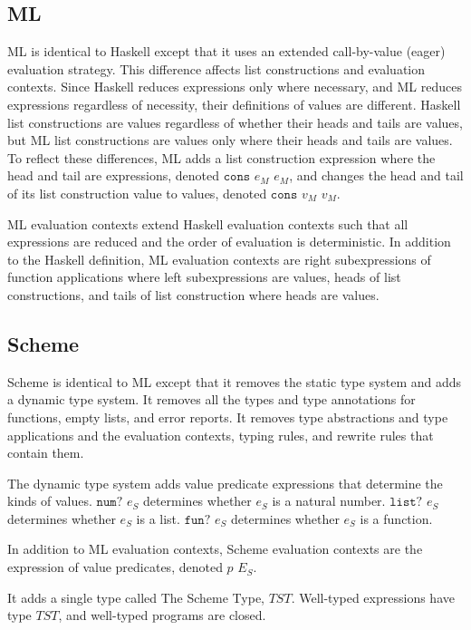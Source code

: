 \subsection{ML}

ML is identical to Haskell except that it uses an extended call-by-value (eager) evaluation strategy.  This difference affects list constructions and evaluation contexts.  Since Haskell reduces expressions only where necessary, and ML reduces expressions regardless of necessity, their definitions of values are different.  Haskell list constructions are values regardless of whether their heads and tails are values, but ML list constructions are values only where their heads and tails are values.  To reflect these differences, ML adds a list construction expression where the head and tail are expressions, denoted $\mathtt{cons}$ $e_{M}$ $e_{M}$, and changes the head and tail of its list construction value to values, denoted $\mathtt{cons}$ $v_{M}$ $v_{M}$.

ML evaluation contexts extend Haskell evaluation contexts such that all expressions are reduced and the order of evaluation is deterministic.  In addition to the Haskell definition, ML evaluation contexts are right subexpressions of function applications where left subexpressions are values, heads of list constructions, and tails of list construction where heads are values.

\subsection{Scheme}

Scheme is identical to ML except that it removes the static type system and adds a dynamic type system.  It removes all the types and type annotations for functions, empty lists, and error reports.  It removes type abstractions and type applications and the evaluation contexts, typing rules, and rewrite rules that contain them.

The dynamic type system adds value predicate expressions that determine the kinds of values.  $\mathtt{num?}$ $e_{S}$ determines whether $e_{S}$ is a natural number.  $\mathtt{list?}$ $e_{S}$ determines whether $e_{S}$ is a list.  $\mathtt{fun?}$ $e_{S}$ determines whether $e_{S}$ is a function.

In addition to ML evaluation contexts, Scheme evaluation contexts are the expression of value predicates, denoted $p$ $E_{S}$.

It adds a single type called The Scheme Type, $TST$.  Well-typed expressions have type $TST$, and well-typed programs are closed.

